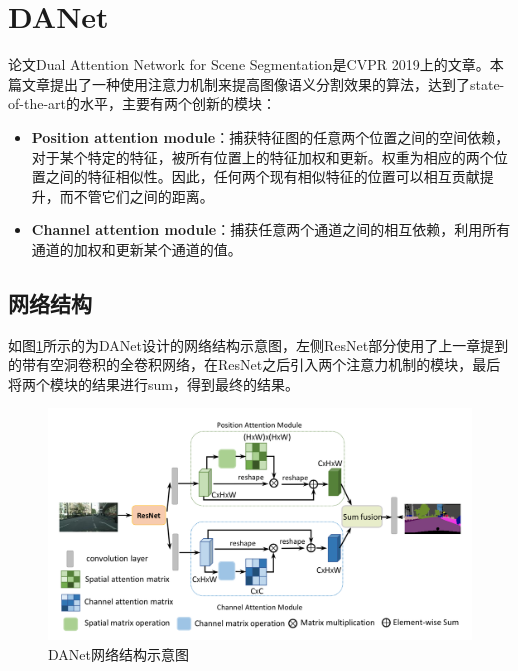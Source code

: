 \documentclass[cn]{elegantbook}
\begin{document}
\section{DANet}
论文Dual Attention Network for Scene Segmentation\cite{fu2018dual}是CVPR 2019上的文章。本篇文章提出了一种使用注意力机制来提高图像语义分割效果的算法，达到了state-of-the-art的水平，主要有两个创新的模块：
\begin{itemize}
	\item \textbf{Position attention module}：捕获特征图的任意两个位置之间的空间依赖，对于某个特定的特征，被所有位置上的特征加权和更新。权重为相应的两个位置之间的特征相似性。因此，任何两个现有相似特征的位置可以相互贡献提升，而不管它们之间的距离。
	\item \textbf{Channel attention module}：捕获任意两个通道之间的相互依赖，利用所有通道的加权和更新某个通道的值。
\end{itemize}

\subsection{网络结构}
如图\ref{danet}所示的为DANet设计的网络结构示意图，左侧ResNet部分使用了上一章提到的带有空洞卷积的全卷积网络，在ResNet之后引入两个注意力机制的模块，最后将两个模块的结果进行sum，得到最终的结果。
\begin{figure}[!h]
	\centering
	\includegraphics[width=\textwidth]{images/danet}
	\caption{\label{danet}DANet网络结构示意图}
\end{figure}
\end{document}
